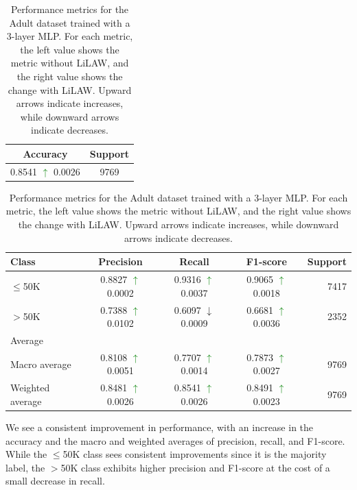 \documentclass{article}
\theoremstyle{plain}
\theoremstyle{definition}
\theoremstyle{remark}
\begin{document}
\begin{table}[ht]
\centering
\small
\begin{subtable}{}
\centering
\begin{tabular}{cc}
\toprule
Accuracy & Support \\
\midrule
0.8541 \textcolor{Green}{\ensuremath{\uparrow}} 0.0026 & 9769 \\
\bottomrule
\end{tabular}
\end{subtable}

\vspace{0.1em}

\begin{subtable}{}
\centering
\begin{tabular}{lcccr}
\toprule
Class & Precision & Recall & F1-score & Support \\
\midrule
$\leq$50K
& 0.8827 \textcolor{Green}{\ensuremath{\uparrow}} 0.0002
& 0.9316 \textcolor{Green}{\ensuremath{\uparrow}} 0.0037
& 0.9065 \textcolor{Green}{\ensuremath{\uparrow}} 0.0018
& 7417 \\

$>$50K
& 0.7388 \textcolor{Green}{\ensuremath{\uparrow}} 0.0102
& 0.6097 \textcolor{BrickRed}{\ensuremath{\downarrow}} 0.0009
& 0.6681 \textcolor{Green}{\ensuremath{\uparrow}} 0.0036
& 2352 \\

\midrule
Average &  &  &  &  \\
\midrule
Macro average
& 0.8108 \textcolor{Green}{\ensuremath{\uparrow}} 0.0051
& 0.7707 \textcolor{Green}{\ensuremath{\uparrow}} 0.0014
& 0.7873 \textcolor{Green}{\ensuremath{\uparrow}} 0.0027
& 9769 \\

Weighted average
& 0.8481 \textcolor{Green}{\ensuremath{\uparrow}} 0.0026
& 0.8541 \textcolor{Green}{\ensuremath{\uparrow}} 0.0026
& 0.8491 \textcolor{Green}{\ensuremath{\uparrow}} 0.0023
& 9769 \\
\bottomrule
\end{tabular}
\end{subtable}

\caption{Performance metrics for the Adult dataset trained with a 3-layer MLP. For each metric, the left value shows the metric without LiLAW, and the right value shows the change with LiLAW. Upward arrows indicate increases, while downward arrows indicate decreases.}
\label{tab:adult}
\end{table}
\vspace{-1.5em}
We see a consistent improvement in performance, with an increase in the accuracy and the macro and weighted averages of precision, recall, and F1-score. While the $\leq$50K class sees consistent improvements since it is the majority label, the $>$50K class exhibits higher precision and F1-score at the cost of a small decrease in recall.
\end{document}

